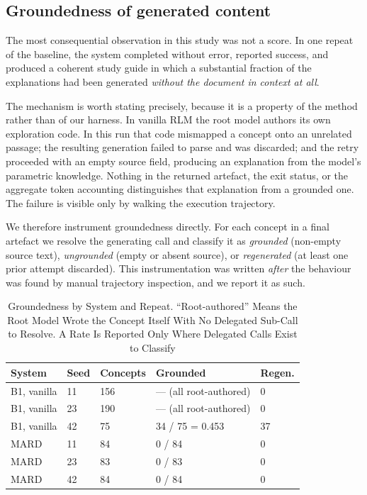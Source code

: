 \documentclass[conference]{IEEEtran}
\begin{document}
\subsection{Groundedness of generated content}
\label{sec:grounding}
The most consequential observation in this study was not a score. In one
repeat of the baseline, the system completed without error, reported success,
and produced a coherent study guide in which a substantial fraction of the
explanations had been generated \emph{without the document in context at
all}.

The mechanism is worth stating precisely, because it is a property of the
method rather than of our harness. In vanilla RLM the root model authors its
own exploration code. In this run that code mismapped a concept onto an
unrelated passage; the resulting generation failed to parse and was
discarded; and the retry proceeded with an empty source field, producing an
explanation from the model's parametric knowledge. Nothing in the returned
artefact, the exit status, or the aggregate token accounting distinguishes
that explanation from a grounded one. The failure is visible only by walking
the execution trajectory.

We therefore instrument groundedness directly. For each concept in a final
artefact we resolve the generating call and classify it as \emph{grounded}
(non-empty source text), \emph{ungrounded} (empty or absent source), or
\emph{regenerated} (at least one prior attempt discarded). This
instrumentation was written \emph{after} the behaviour was found by manual
trajectory inspection, and we report it as such.

\begin{table}[!t]
\caption{Groundedness by System and Repeat. ``Root-authored'' Means the Root
Model Wrote the Concept Itself With No Delegated Sub-Call to Resolve. A Rate
Is Reported Only Where Delegated Calls Exist to Classify}
\label{tab:grounding}
\centering
\renewcommand{\arraystretch}{1.2}
\begin{tabular}{@{}p{1.95cm}R{0.62cm}R{1.05cm}R{1.5cm}R{1.15cm}@{}}
\toprule
\textbf{System} & \textbf{Seed} & \textbf{Concepts} & \textbf{Grounded} &
\textbf{Regen.} \\
\midrule
B1, vanilla & 11 & 156 & --- (all root-authored) & 0 \\
B1, vanilla & 23 & 190 & --- (all root-authored) & 0 \\
B1, vanilla & 42 & 75 & 34 / 75 = 0.453 & 37 \\
\midrule
MARD & 11 & 84 & 0 / 84 & 0 \\
MARD & 23 & 83 & 0 / 83 & 0 \\
MARD & 42 & 84 & 0 / 84 & 0 \\
\bottomrule
\end{tabular}
\end{table}
\end{document}

